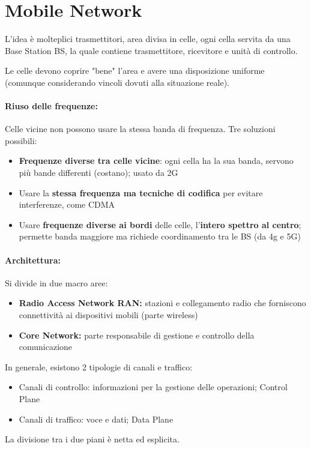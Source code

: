 \section{Mobile Network}

L'idea è molteplici trasmettitori, area divisa in celle, ogni cella servita da una Base Station BS, la quale contiene trasmettitore, ricevitore e unità di controllo.

Le celle devono coprire "bene" l'area e avere una disposizione uniforme (comunque considerando vincoli dovuti alla situazione reale).

\paragraph{Riuso delle frequenze:} Celle vicine non possono usare la stessa banda di frequenza. Tre soluzioni possibili: 
\begin{itemize}
    \item \textbf{Frequenze diverse tra celle vicine}: ogni cella ha la sua banda, servono più bande differenti (costano); usato da 2G
    
    \item Usare la \textbf{stessa frequenza ma tecniche di codifica} per evitare interferenze, come CDMA
    
    \item Usare \textbf{frequenze diverse ai bordi} delle celle, l'\textbf{intero spettro al centro}; permette banda maggiore ma richiede coordinamento tra le BS (da 4g e 5G)
\end{itemize}

\paragraph{Architettura:} Si divide in due macro aree: 
\begin{itemize}
    \item \textbf{Radio Access Network RAN:} stazioni e collegamento radio che forniscono connettività ai dispositivi mobili (parte wireless)
    
    \item \textbf{Core Network:} parte responsabile di gestione e controllo della comunicazione
\end{itemize}

In generale, esistono 2 tipologie di canali e traffico:
\begin{itemize}
    \item Canali di controllo: informazioni per la gestione delle operazioni; Control Plane
    
    \item Canali di traffico: voce e dati; Data Plane
\end{itemize}
La divisione tra i due piani è netta ed esplicita.

